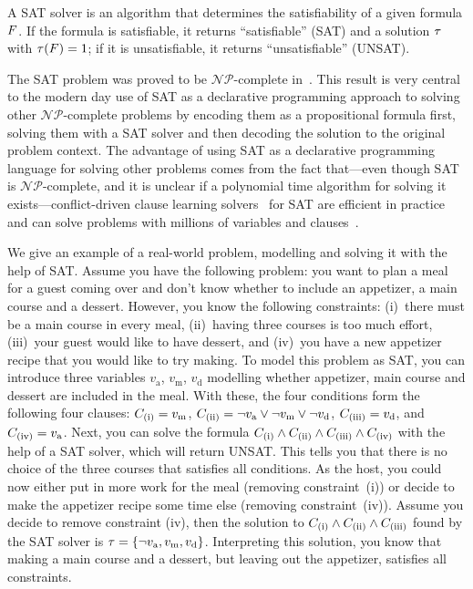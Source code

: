 A SAT solver is an algorithm that determines the satisfiability of a given formula $F$.
If the formula is satisfiable, it returns ``satisfiable'' (SAT) and a solution $\tau$ with $\tau(F)=1$;
if it is unsatisfiable, it returns ``unsatisfiable'' (UNSAT).

The SAT problem was proved to be $\mathcal{NP}$-complete in~\textcite{DBLP:conf/stoc/Cook71}.
This result is very central to the modern day use of SAT as a declarative programming approach to solving other $\mathcal{NP}$-complete problems by encoding them as a propositional formula first, solving them with a SAT solver and then decoding the solution to the original problem context.
The advantage of using SAT as a declarative programming language for solving other problems comes from the fact that---even though SAT is $\mathcal{NP}$-complete, and it is unclear if a polynomial time algorithm for solving it exists---conflict-driven clause learning solvers~\autocite{handbook2-cdcl} for SAT are efficient in practice and can solve problems with millions of variables and clauses~\autocite{}.

\begin{example}\label{ex:sat-modelling}
  We give an example of a real-world problem, modelling and solving it with the help of SAT.
  Assume you have the following problem:
  you want to plan a meal for a guest coming over and don't know whether to include an appetizer, a main course and a dessert.
  However, you know the following constraints:
  (i)~there must be a main course in every meal, (ii)~having three courses is too much effort, (iii)~your guest would like to have dessert, and (iv)~you have a new appetizer recipe that you would like to try making.
  To model this problem as SAT, you can introduce three variables $v_\text{a}$, $v_\text{m}$, $v_\text{d}$ modelling whether appetizer, main course and dessert are included in the meal.
  With these, the four conditions form the following four clauses:
  $C_\text{(i)} = v_\text{m}$, $C_\text{(ii)} = \lnot v_\text{a} \lor \lnot v_\text{m} \lor \lnot v_\text{d}$, $C_\text{(iii)} = v_\text{d}$, and $C_\text{(iv)} = v_\text{a}$.
  Next, you can solve the formula $C_\text{(i)} \land C_\text{(ii)} \land C_\text{(iii)} \land C_\text{(iv)}$ with the help of a SAT solver, which will return UNSAT.
  This tells you that there is no choice of the three courses that satisfies all conditions.
  As the host, you could now either put in more work for the meal (removing constraint~(i)) or decide to make the appetizer recipe some time else (removing constraint~(iv)).
  Assume you decide to remove constraint (iv), then the solution to $C_\text{(i)} \land C_\text{(ii)} \land C_\text{(iii)}$ found by the SAT solver is $\tau = \{ \lnot v_\text{a}, v_\text{m}, v_\text{d} \}$.
  Interpreting this solution, you know that making a main course and a dessert, but leaving out the appetizer, satisfies all constraints.
\end{example}

